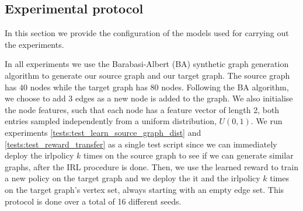 \documentclass{report}
\numberwithin{equation}{section}
\numberwithin{figure}{section}
\numberwithin{table}{section}
\numberwithin{algorithm}{section}
\begin{document}



\subsection{Experimental protocol}
In this section we provide the configuration of the models 
used for carrying out the experiments.

In all experiments we use the Barabasi-Albert (BA) synthetic graph 
generation algorithm \citep{BAGraphs} to generate our source 
graph and our target graph. The source graph has $40$ nodes 
while the target graph has $80$ nodes. Following the BA 
algorithm, we choose to add $3$ edges as a new node is added to the 
graph. We also initialise the node features, such that each node 
has a feature vector of length 2, both entries sampled independently 
from a uniform distribution, $U(0, 1)$.
We run experiments \ref{tests:test_learn_source_graph_dist} 
and \ref{tests:test_reward_transfer} as a single test script 
since we can immediately deploy the irlpolicy $k$ times on 
the source graph to see if we can generate similar graphs, 
after the IRL procedure is done. Then, we use the learned reward 
to train a new policy on the target graph and we deploy the it 
and the irlpolicy $k$ times on the target graph's vertex set, 
always starting with an empty edge set. This protocol is 
done over a total of 16 different seeds.
\end{document}
